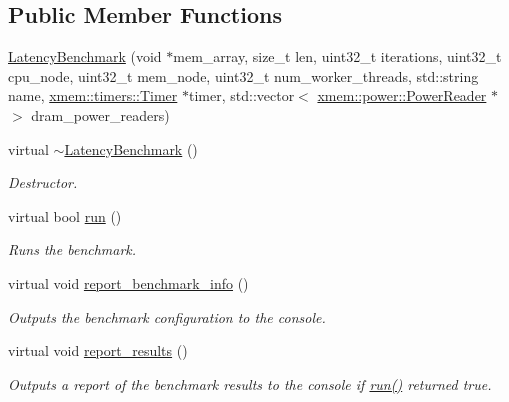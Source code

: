 \subsection*{Public Member Functions}
\begin{DoxyCompactItemize}
\item 
\hyperlink{classxmem_1_1benchmark_1_1_latency_benchmark_a485434e0f506427b28073a2a3e287e21}{Latency\-Benchmark} (void $\ast$mem\-\_\-array, size\-\_\-t len, uint32\-\_\-t iterations, uint32\-\_\-t cpu\-\_\-node, uint32\-\_\-t mem\-\_\-node, uint32\-\_\-t num\-\_\-worker\-\_\-threads, std\-::string name, \hyperlink{classxmem_1_1timers_1_1_timer}{xmem\-::timers\-::\-Timer} $\ast$timer, std\-::vector$<$ \hyperlink{classxmem_1_1power_1_1_power_reader}{xmem\-::power\-::\-Power\-Reader} $\ast$ $>$ dram\-\_\-power\-\_\-readers)
\item 
\hypertarget{classxmem_1_1benchmark_1_1_latency_benchmark_a39da6c4e2374ad96a939c87a4e8b8453}{virtual \hyperlink{classxmem_1_1benchmark_1_1_latency_benchmark_a39da6c4e2374ad96a939c87a4e8b8453}{$\sim$\-Latency\-Benchmark} ()}\label{classxmem_1_1benchmark_1_1_latency_benchmark_a39da6c4e2374ad96a939c87a4e8b8453}

\begin{DoxyCompactList}\small\item\em Destructor. \end{DoxyCompactList}\item 
virtual bool \hyperlink{classxmem_1_1benchmark_1_1_latency_benchmark_ab68c299bf41fb30f9be597ff79188139}{run} ()
\begin{DoxyCompactList}\small\item\em Runs the benchmark. \end{DoxyCompactList}\item 
\hypertarget{classxmem_1_1benchmark_1_1_latency_benchmark_a2714dfbf9be2eef8ac4089ad610db651}{virtual void \hyperlink{classxmem_1_1benchmark_1_1_latency_benchmark_a2714dfbf9be2eef8ac4089ad610db651}{report\-\_\-benchmark\-\_\-info} ()}\label{classxmem_1_1benchmark_1_1_latency_benchmark_a2714dfbf9be2eef8ac4089ad610db651}

\begin{DoxyCompactList}\small\item\em Outputs the benchmark configuration to the console. \end{DoxyCompactList}\item 
\hypertarget{classxmem_1_1benchmark_1_1_latency_benchmark_ae16f89eb9f413734989ef8c51ec3e066}{virtual void \hyperlink{classxmem_1_1benchmark_1_1_latency_benchmark_ae16f89eb9f413734989ef8c51ec3e066}{report\-\_\-results} ()}\label{classxmem_1_1benchmark_1_1_latency_benchmark_ae16f89eb9f413734989ef8c51ec3e066}

\begin{DoxyCompactList}\small\item\em Outputs a report of the benchmark results to the console if \hyperlink{classxmem_1_1benchmark_1_1_latency_benchmark_ab68c299bf41fb30f9be597ff79188139}{run()} returned true. \end{DoxyCompactList}\end{DoxyCompactItemize}
